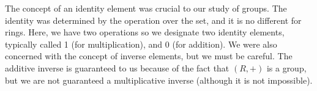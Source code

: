 The concept of an identity element was crucial to our study of groups.
The identity was determined by the operation over the set, and it is no different for rings.
Here, we have two operations so we designate two identity elements, typically called 1 (for multiplication), and 0 (for addition).
We were also concerned with the concept of inverse elements, but we must be careful.
The additive inverse is guaranteed to us because of the fact that $(R,+)$ is a group, but we are not guaranteed a multiplicative inverse (although it is not impossible).
